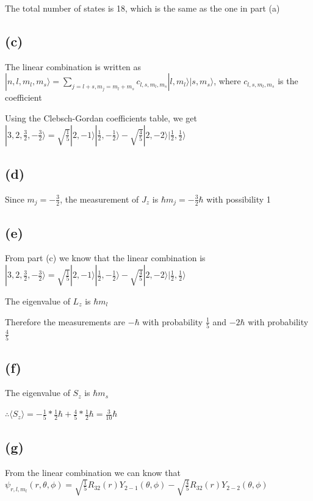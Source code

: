 \documentclass[12pt]{article}
\begin{document}
\begin{spacing}{2.0}
The total number of states is 18, which is the same as the one in part (a)

\subsection*{(c)}

The linear combination is written as $|n,l,m_l,m_s \rangle=\sum_{j=l+s, m_j=m_l+m_s} c_{l,s,m_l,m_s} |l,m_l \rangle |s,m_s\rangle$, where $c_{l,s,m_l,m_s}$ is the coefficient

Using the Clebsch-Gordan coefficients table, we get $|3,2,\frac{3}{2},-\frac{3}{2} \rangle = \sqrt{\frac{1}{5}} |2,-1\rangle |\frac{1}{2},-\frac{1}{2}\rangle -  \sqrt{\frac{4}{5}} |2,-2\rangle |\frac{1}{2},\frac{1}{2}\rangle$

\subsection*{(d)}
Since $m_j=-\frac{3}{2}$, the measurement of $J_z$ is $\hbar m_j=-\frac{3}{2} \hbar$ with possibility 1

\subsection*{(e)}

From part (c) we know that the linear combination is $|3,2,\frac{3}{2},-\frac{3}{2} \rangle = \sqrt{\frac{1}{5}} |2,-1\rangle |\frac{1}{2},-\frac{1}{2}\rangle -  \sqrt{\frac{4}{5}} |2,-2\rangle |\frac{1}{2},\frac{1}{2}\rangle$

The eigenvalue of $L_z$ is $\hbar m_l$

Therefore the measurements are $-\hbar$ with probability $\frac{1}{5}$ and $-2\hbar$ with probability $\frac{4}{5}$

\subsection*{(f)}

The eigenvalue of $S_z$ is $\hbar m_s$

$\therefore \langle S_z \rangle= -\frac{1}{5}* \frac{1}{2} \hbar +\frac{4}{5}*\frac{1}{2} \hbar= \frac{3}{10}\hbar$

\subsection*{(g)}

From the linear combination we can know that $\psi_{r,l,m_l}(r,\theta,\phi)= \sqrt{\frac{1}{5}} R_{32}(r)Y_{2-1}(\theta,\phi) -  \sqrt{\frac{4}{5}} R_{32}(r)Y_{2-2}(\theta,\phi)$


\end{spacing}
\end{document}
